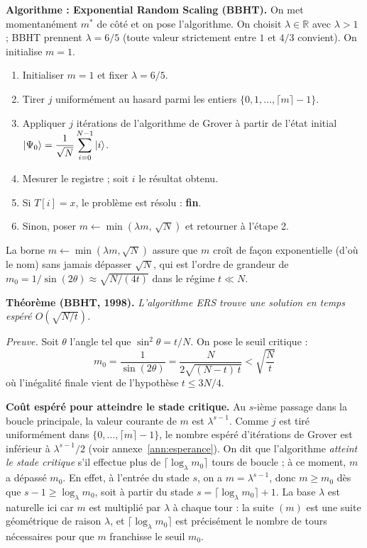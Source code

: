 \documentclass{ceri/sty/rapport}
\begin{document}
\medskip\noindent\textbf{Algorithme : Exponential Random Scaling (BBHT).}
On met momentanément $m^*$ de côté et on pose l'algorithme. On choisit $\lambda \in \mathbb{R}$ avec $\lambda > 1$ ; BBHT prennent $\lambda = 6/5$ (toute valeur strictement entre $1$ et $4/3$ convient). On initialise $m = 1$.

\begin{enumerate}
  \item Initialiser $m = 1$ et fixer $\lambda = 6/5$.
  \item Tirer $j$ uniformément au hasard parmi les entiers $\{0, 1, \ldots, \lceil m \rceil - 1\}$.
  \item Appliquer $j$ itérations de l'algorithme de Grover à partir de l'état initial
        $\ket{\Psi_0} = \dfrac{1}{\sqrt{N}}\displaystyle\sum_{i=0}^{N-1}\ket{i}$.
  \item Mesurer le registre ; soit $i$ le résultat obtenu.
  \item Si $T[i] = x$, le problème est résolu : \textbf{fin}.
  \item Sinon, poser $m \leftarrow \min(\lambda m,\, \sqrt{N})$ et retourner à l'étape 2.
\end{enumerate}

La borne $m \leftarrow \min(\lambda m, \sqrt{N})$ assure que $m$ croît de façon exponentielle (d'où le nom) sans jamais dépasser $\sqrt{N}$, qui est l'ordre de grandeur de $m_0 = 1/\sin(2\theta) \approx \sqrt{N/(4t)}$ dans le régime $t \ll N$.

\medskip\noindent\textbf{Théorème (BBHT, 1998).}
\textit{L'algorithme ERS trouve une solution en temps espéré $O(\sqrt{N/t})$.}

\medskip\noindent\textit{Preuve.}
Soit $\theta$ l'angle tel que $\sin^2\theta = t/N$. On pose le seuil critique :
\[
m_0 = \frac{1}{\sin(2\theta)} = \frac{N}{2\sqrt{(N-t)\,t}} < \sqrt{\frac{N}{t}}
\]
où l'inégalité finale vient de l'hypothèse $t \le 3N/4$.

\medskip\noindent\textbf{Coût espéré pour atteindre le stade critique.}
Au $s$-ième passage dans la boucle principale, la valeur courante de $m$ est $\lambda^{s-1}$.
Comme $j$ est tiré uniformément dans $\{0,\ldots,\lceil m \rceil - 1\}$, le nombre espéré d'itérations de Grover est inférieur à $\lambda^{s-1}/2$ (voir annexe~\ref{ann:esperance}).
On dit que l'algorithme \emph{atteint le stade critique} s'il effectue plus de $\lceil \log_\lambda m_0 \rceil$ tours de boucle ; à ce moment, $m$ a dépassé $m_0$.
En effet, à l'entrée du stade $s$, on a $m = \lambda^{s-1}$, donc $m \ge m_0$ dès que $s - 1 \ge \log_\lambda m_0$, soit à partir du stade $s = \lceil \log_\lambda m_0 \rceil + 1$.
La base $\lambda$ est naturelle ici car $m$ est multiplié par $\lambda$ à chaque tour : la suite $(m)$ est une suite géométrique de raison $\lambda$, et $\lceil \log_\lambda m_0 \rceil$ est précisément le nombre de tours nécessaires pour que $m$ franchisse le seuil $m_0$.
\end{document}
